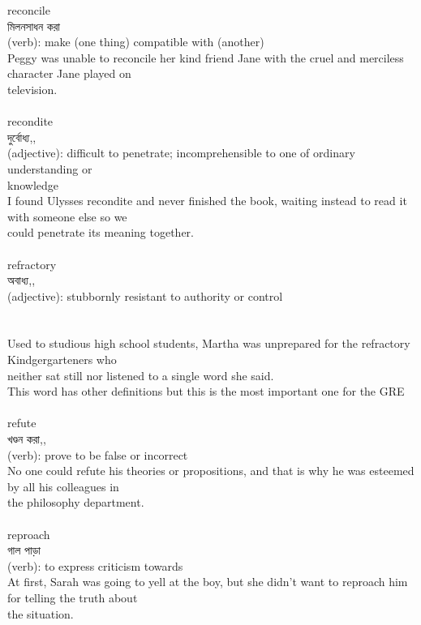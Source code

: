 \documentclass{article}
\begin{document}
{reconcile}\\
{মিলনসাধন করা}\\
{(verb): make (one thing) compatible with (another)\\Peggy was unable to reconcile her kind friend Jane with the cruel and merciless character Jane played on\\television.\\}\\
{recondite}\\
{দুর্বোধ্য,,}\\
{(adjective): difficult to penetrate; incomprehensible to one of ordinary understanding or\\knowledge\\I found Ulysses recondite and never finished the book, waiting instead to read it with someone else so we\\could penetrate its meaning together.\\}\\
{refractory}\\
{অবাধ্য,,}\\
{(adjective): stubbornly resistant to authority or control\\\\                                                                                \\Used to studious high school students, Martha was unprepared for the refractory Kindgergarteners who\\neither sat still nor listened to a single word she said.\\This word has other definitions but this is the most important one for the GRE\\}\\
{refute}\\
{খণ্ডন করা,,}\\
{(verb): prove to be false or incorrect\\No one could refute his theories or propositions, and that is why he was esteemed by all his colleagues in\\the philosophy department.\\}\\
{reproach}\\
{গাল পাড়া}\\
{(verb): to express criticism towards\\At first, Sarah was going to yell at the boy, but she didn't want to reproach him for telling the truth about\\the situation.\\}\\
\end{document}
